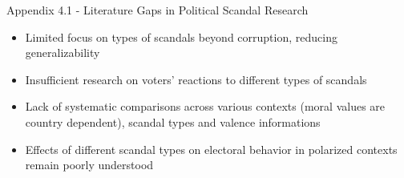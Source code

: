 \documentclass[9pt, aspectratio=169]{beamer}
\newcommand{\customcite}[1]{\textcolor{blue}{\footnotesize\parencite{#1}}}
\newcommand{\customcites}[1]{\textcolor{blue}{\footnotesize\parencites{#1}}}
\begin{document}
\begin{frame}{Appendix 4.1 - Literature Gaps in Political Scandal Research}
    \begin{itemize}
        \item Limited focus on types of scandals beyond corruption, reducing generalizability \customcite{kumlin2012scandal} \vspace{0.3cm}
        \item Insufficient research on voters' reactions to different types of scandals \vspace{0.3cm}
        \item Lack of systematic comparisons across various contexts (moral values are country dependent), scandal types and valence informations \customcite{kumlin2012scandal} \vspace{0.3cm}
        \item Effects of different scandal types on electoral behavior in polarized contexts remain poorly understood \customcites{puglisi2011, darr2019collision, Rottinghaus_2023} \vspace{0.3cm} 
    \end{itemize}
\end{frame}
\end{document}
